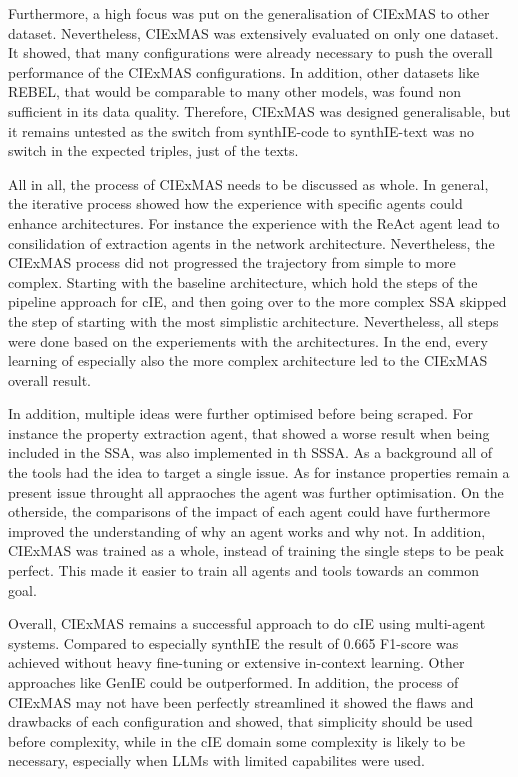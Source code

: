 \documentclass[a4paper,oneside,bibliography=totoc]{scrbook}
\begin{document}
Furthermore, a high focus was put on the generalisation of CIExMAS to other dataset. Nevertheless, CIExMAS was extensively evaluated on only one dataset. It showed, that many configurations were already necessary to push the overall performance of the CIExMAS configurations. In addition, other datasets like REBEL, that would be comparable to many other models, was found non sufficient in its data quality. Therefore, CIExMAS was designed generalisable, but it remains untested as the switch from synthIE-code to synthIE-text was no switch in the expected triples, just of the texts.

All in all, the process of CIExMAS needs to be discussed as whole. In general, the iterative process showed how the experience with specific agents could enhance architectures. For instance the experience with the ReAct agent lead to consilidation of extraction agents in the network architecture. Nevertheless, the CIExMAS process did not progressed the trajectory from simple to more complex. Starting with the baseline architecture, which hold the steps of the pipeline approach for \ac{cIE}, and then going over to the more complex \ac{SSA} skipped the step of starting with the most simplistic architecture. Nevertheless, all steps were done based on the experiements with the architectures. In the end, every learning of especially also the more complex architecture led to the CIExMAS overall result.

In addition, multiple ideas were further optimised before being scraped. For instance the property extraction agent, that showed a worse result when being included in the \ac{SSA}, was also implemented in th \ac{SSSA}. As a background all of the tools had the idea to target a single issue. As for instance properties remain a present issue throught all appraoches the agent was further optimisation. On the otherside, the comparisons of the impact of each agent could have furthermore improved the understanding of why an agent works and why not. In addition, CIExMAS was trained as a whole, instead of training the single steps to be peak perfect. This made it easier to train all agents and tools towards an common goal.

Overall, CIExMAS remains a successful approach to do \ac{cIE} using multi-agent systems. Compared to especially synthIE the result of 0.665 F1-score was achieved without heavy fine-tuning or extensive in-context learning. Other approaches like GenIE could be outperformed. In addition, the process of CIExMAS may not have been perfectly streamlined it showed the flaws and drawbacks of each configuration and showed, that simplicity should be used before complexity, while in the \ac{cIE} domain some complexity is likely to be necessary, especially when \acp{LLM} with limited capabilites were used.
\end{document}
